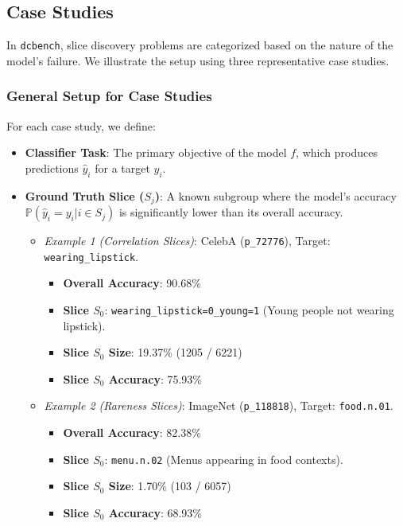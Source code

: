 \subsection{Case Studies}

In \texttt{dcbench}, slice discovery problems are categorized based on the nature of the model's failure. We illustrate the setup using three representative case studies.

\subsubsection{General Setup for Case Studies}
For each case study, we define:
\begin{itemize}
    \item \textbf{Classifier Task}: The primary objective of the model $f$, which produces predictions $\hat{y}_i$ for a target $y_i$.
    \item \textbf{Ground Truth Slice ($S_j$)}: A known subgroup where the model's accuracy $\mathbb{P}(\hat{y}_i = y_i | i \in S_j)$ is significantly lower than its overall accuracy.
    \begin{itemize}
        \item \textit{Example 1 (Correlation Slices)}: CelebA (\texttt{p\_72776}), Target: \texttt{wearing\_lipstick}.
        \begin{itemize}
            \item \textbf{Overall Accuracy}: 90.68\%
            \item \textbf{Slice $S_0$}: \texttt{wearing\_lipstick=0\_young=1} (Young people not wearing lipstick).
            \item \textbf{Slice $S_0$ Size}: 19.37\% (1205 / 6221)
            \item \textbf{Slice $S_0$ Accuracy}: 75.93\%
        \end{itemize}
        \item \textit{Example 2 (Rareness Slices)}: ImageNet (\texttt{p\_118818}), Target: \texttt{food.n.01}.
        \begin{itemize}
            \item \textbf{Overall Accuracy}: 82.38\%
            \item \textbf{Slice $S_0$}: \texttt{menu.n.02} (Menus appearing in food contexts).
            \item \textbf{Slice $S_0$ Size}: 1.70\% (103 / 6057)
            \item \textbf{Slice $S_0$ Accuracy}: 68.93\%
        \end{itemize}

\end{itemize}
\end{itemize}
